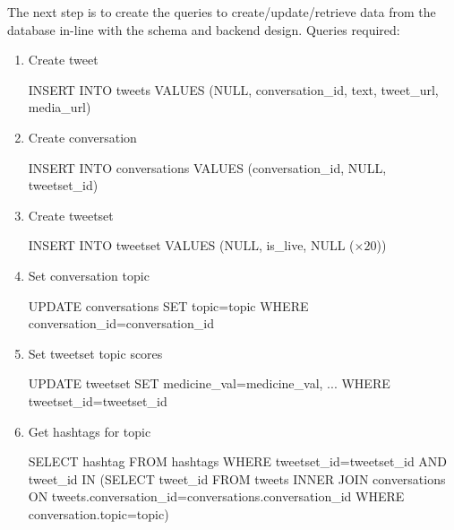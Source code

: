 The next step is to create the queries to create/update/retrieve data from the database in-line with the schema and backend design. Queries required:
\begin{enumerate}
    \item Create tweet
    \begin{algorithm}
        \begin{algorithmic}
            \STATE INSERT INTO tweets VALUES (NULL, conversation\_id, text, tweet\_url, media\_url)
        \end{algorithmic}
    \end{algorithm}
    \item Create conversation
    \begin{algorithm}
        \begin{algorithmic}
            \STATE INSERT INTO conversations VALUES (conversation\_id, NULL, tweetset\_id)
        \end{algorithmic}
    \end{algorithm}
    \item Create tweetset
    \begin{algorithm}
        \begin{algorithmic}
            \STATE INSERT INTO tweetset VALUES (NULL, is\_live, NULL ($\times 20$))
        \end{algorithmic}
    \end{algorithm}
    \item Set conversation topic
    \begin{algorithm}
        \begin{algorithmic}
            \STATE UPDATE conversations SET topic=topic WHERE conversation\_id=conversation\_id
        \end{algorithmic}
    \end{algorithm}
    \item Set tweetset topic scores
    \begin{algorithm}
        \begin{algorithmic}
            \STATE UPDATE tweetset SET medicine\_val=medicine\_val, ... WHERE tweetset\_id=tweetset\_id
        \end{algorithmic}
    \end{algorithm}
    \item Get hashtags for topic
    \begin{algorithm}
        \begin{algorithmic}
            \STATE SELECT hashtag FROM hashtags WHERE tweetset\_id=tweetset\_id AND tweet\_id IN (SELECT tweet\_id FROM tweets INNER JOIN conversations ON tweets.conversation\_id=conversations.conversation\_id WHERE conversation.topic=topic)

\end{algorithmic}
\end{algorithm}
\end{enumerate}
